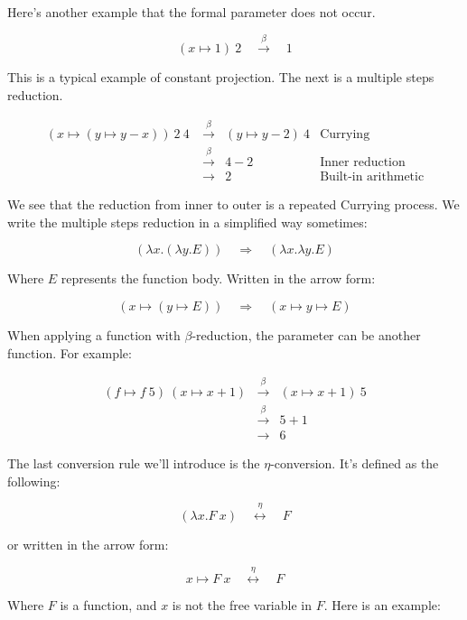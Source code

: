 \documentclass[b5paper]{article}
\begin{document}
Here's another example that the formal parameter does not occur.

\[
(x \mapsto 1)\ 2 \quad \overset{\beta}{\longrightarrow} \quad 1
\]

This is a typical example of constant projection. The next is a multiple steps reduction.

\[
\begin{array}{rcll}
(x \mapsto (y \mapsto y - x))\ 2\ 4\ & \overset{\beta}{\longrightarrow} & (y \mapsto y - 2)\ 4 & \text{Currying} \\
                                     & \overset{\beta}{\longrightarrow} & 4 - 2 & \text{Inner reduction} \\
                                     & \longrightarrow & 2 & \text{Built-in arithmetic}
\end{array}
\]

We see that the reduction from inner to outer is a repeated Currying process. We write the multiple steps reduction in a simplified way sometimes:

\[
(\lambda x . (\lambda y . E)) \quad \Rightarrow \quad (\lambda x . \lambda y . E)
\]

Where $E$ represents the function body. Written in the arrow form:

\[
(x \mapsto (y \mapsto E)) \quad \Rightarrow \quad (x \mapsto y \mapsto E)
\]

When applying a function with $\beta$-reduction, the parameter can be another function. For example:

\[
\begin{array}{rcl}
(f \mapsto f\ 5)\ (x \mapsto x + 1) & \overset{\beta}{\longrightarrow} & (x \mapsto x + 1)\ 5 \\
                                    & \overset{\beta}{\longrightarrow} & 5 + 1 \\
                                    & \longrightarrow & 6
\end{array}
\]

The last conversion rule we'll introduce is the $\eta$-conversion. It's defined as the following:

\[
(\lambda x . F\ x) \quad \overset{\eta}{\longleftrightarrow} \quad F
\]

or written in the arrow form:

\[
x \mapsto F\ x \quad \overset{\eta}{\longleftrightarrow} \quad F
\]

Where $F$ is a function, and $x$ is not the free variable in $F$. Here is an example:
\end{document}
